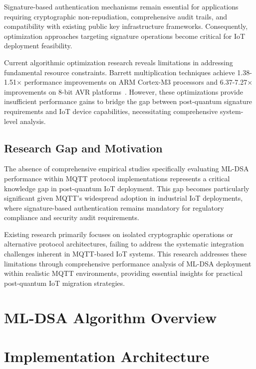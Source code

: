 \documentclass[journal=tches,final]{iacrtrans}
\begin{document}
Signature-based authentication mechanisms remain essential for applications requiring cryptographic non-repudiation, comprehensive audit trails, and compatibility with existing public key infrastructure frameworks. Consequently, optimization approaches targeting signature operations become critical for IoT deployment feasibility.

Current algorithmic optimization research reveals limitations in addressing fundamental resource constraints. Barrett multiplication techniques achieve 1.38-1.51× performance improvements on ARM Cortex-M3 processors and 6.37-7.27× improvements on 8-bit AVR platforms~\cite{Barrett2023}. However, these optimizations provide insufficient performance gains to bridge the gap between post-quantum signature requirements and IoT device capabilities, necessitating comprehensive system-level analysis.

\subsection{Research Gap and Motivation}

The absence of comprehensive empirical studies specifically evaluating ML-DSA performance within MQTT protocol implementations represents a critical knowledge gap in post-quantum IoT deployment. This gap becomes particularly significant given MQTT's widespread adoption in industrial IoT deployments, where signature-based authentication remains mandatory for regulatory compliance and security audit requirements.

Existing research primarily focuses on isolated cryptographic operations or alternative protocol architectures, failing to address the systematic integration challenges inherent in MQTT-based IoT systems. This research addresses these limitations through comprehensive performance analysis of ML-DSA deployment within realistic MQTT environments, providing essential insights for practical post-quantum IoT migration strategies.

\color{black}

\section{ML-DSA Algorithm Overview}\label{sec:mldsa}

\section{Implementation Architecture}\label{sec:architecture}
\end{document}
